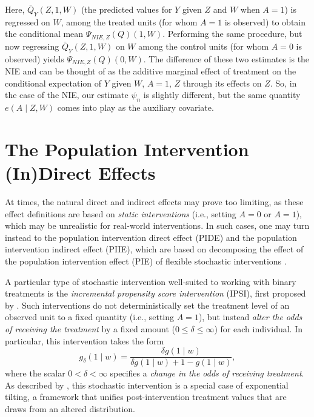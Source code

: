 \documentclass[
  12pt, krantz2,
]{krantz}
\theoremstyle{definition}
\theoremstyle{definition}
\theoremstyle{definition}
\newcommand{\1}{\mathbbm{1}}
\begin{document}
Here, \(\bar{Q}_Y(Z, 1, W)\) (the predicted values for \(Y\) given \(Z\) and \(W\) when
\(A = 1\)) is regressed on \(W\), among the treated units (for whom \(A = 1\) is
observed) to obtain the conditional mean \(\Psi_{NIE, Z}(Q)(1, W)\). Performing
the same procedure, but now regressing \(\bar{Q}_Y(Z, 1, W)\) on \(W\) among the
control units (for whom \(A = 0\) is observed) yields \(\Psi_{NIE,Z}(Q)(0, W)\). The
difference of these two estimates is the NIE and can be thought of as the
additive marginal effect of treatment on the conditional expectation of \(Y\)
given \(W\), \(A = 1\), \(Z\) through its effects on \(Z\). So, in the case of the NIE,
our estimate \(\psi_n\) is slightly different, but the same quantity \(e(A \mid Z, W)\) comes into play as the auxiliary covariate.

\hypertarget{the-population-intervention-indirect-effects}{%
\section{The Population Intervention (In)Direct Effects}\label{the-population-intervention-indirect-effects}}

At times, the natural direct and indirect effects may prove too limiting, as
these effect definitions are based on \emph{static interventions} (i.e., setting
\(A = 0\) or \(A = 1\)), which may be unrealistic for real-world interventions. In
such cases, one may turn instead to the population intervention direct effect
(PIDE) and the population intervention indirect effect (PIIE), which are based
on decomposing the effect of the population intervention effect (PIE) of
flexible stochastic interventions \citep{diaz2020causal}.

A particular type of stochastic intervention well-suited to working with binary
treatments is the \emph{incremental propensity score intervention} (IPSI), first
proposed by \citet{kennedy2017nonparametric}. Such interventions do not
deterministically set the treatment level of an observed unit to a fixed
quantity (i.e., setting \(A = 1\)), but instead \emph{alter the odds of receiving the
treatment} by a fixed amount (\(0 \leq \delta \leq \infty\)) for each individual.
In particular, this intervention takes the form
\begin{equation*}
  g_{\delta}(1 \mid w) = \frac{\delta g(1 \mid w)}{\delta g(1 \mid w) + 1
  - g(1\mid w)},
\end{equation*}
where the scalar \(0 < \delta < \infty\) specifies a \emph{change in the odds of
receiving treatment}. As described by \citet{diaz2020causal}, this stochastic
intervention is a special case of exponential tilting, a framework that unifies
post-intervention treatment values that are draws from an altered distribution.
\end{document}
